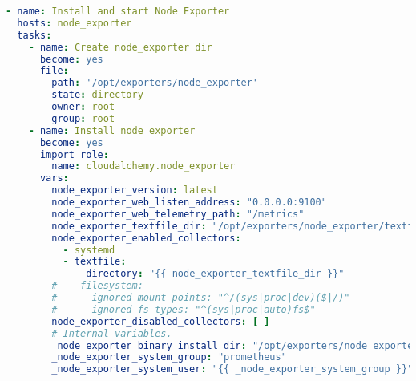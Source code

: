 \begin{lstlisting}[language=yaml,caption={Playbook creado para instalar \textit{node\_exporter}},label=lst:playbook]
- name: Install and start Node Exporter
  hosts: node_exporter
  tasks:
    - name: Create node_exporter dir
      become: yes
      file:
        path: '/opt/exporters/node_exporter'
        state: directory
        owner: root
        group: root
    - name: Install node exporter
      become: yes
      import_role:
        name: cloudalchemy.node_exporter
      vars:
        node_exporter_version: latest
        node_exporter_web_listen_address: "0.0.0.0:9100"
        node_exporter_web_telemetry_path: "/metrics"
        node_exporter_textfile_dir: "/opt/exporters/node_exporter/textfile_collector"
        node_exporter_enabled_collectors:
          - systemd
          - textfile:
              directory: "{{ node_exporter_textfile_dir }}"
        #  - filesystem:
        #      ignored-mount-points: "^/(sys|proc|dev)($|/)"
        #      ignored-fs-types: "^(sys|proc|auto)fs$"
        node_exporter_disabled_collectors: [ ]
        # Internal variables.
        _node_exporter_binary_install_dir: "/opt/exporters/node_exporter"
        _node_exporter_system_group: "prometheus"
        _node_exporter_system_user: "{{ _node_exporter_system_group }}"
\end{lstlisting}
